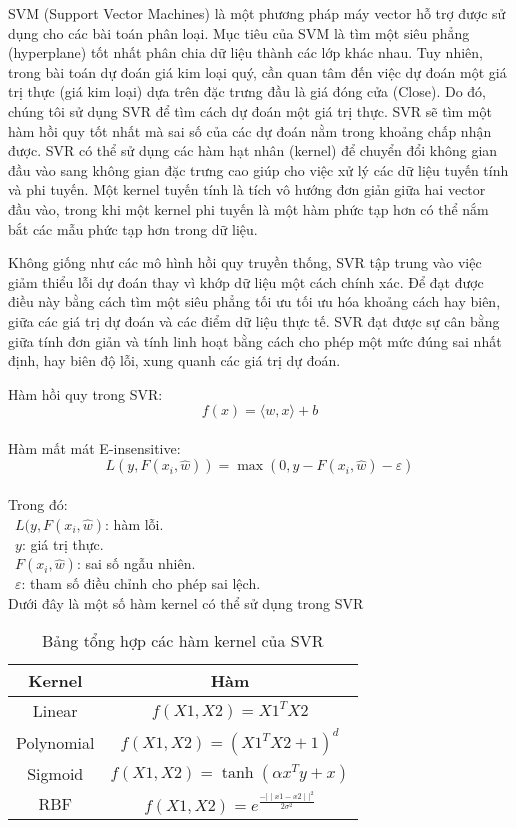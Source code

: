 SVM (Support Vector Machines) là một phương pháp máy vector hỗ trợ được sử dụng cho các bài toán phân loại. Mục tiêu của SVM là tìm một siêu phẳng (hyperplane) tốt nhất phân chia dữ liệu thành các lớp khác nhau. Tuy nhiên, trong bài toán dự đoán giá kim loại quý, cần quan tâm đến việc dự đoán một giá trị thực (giá kim loại) dựa trên đặc trưng đầu là giá đóng cửa (Close). Do đó, chúng tôi sử dụng SVR để tìm cách dự đoán một giá trị thực. SVR sẽ tìm một hàm hồi quy tốt nhất mà sai số của các dự đoán nằm trong khoảng chấp nhận được. SVR có thể sử dụng các hàm hạt nhân (kernel) để chuyển đổi không gian đầu vào sang không gian đặc trưng cao giúp cho việc xử lý các dữ liệu tuyến tính và phi tuyến. Một kernel tuyến tính là tích vô hướng đơn giản giữa hai vector đầu vào, trong khi một kernel phi tuyến là một hàm phức tạp hơn có thể nắm bắt các mẫu phức tạp hơn trong dữ liệu. 

Không giống như các mô hình hồi quy truyền thống, SVR tập trung vào việc giảm thiểu lỗi dự đoán thay vì khớp dữ liệu một cách chính xác. Để đạt được điều này bằng cách tìm một siêu phẳng tối ưu tối ưu hóa khoảng cách hay biên, giữa các giá trị dự đoán và các điểm dữ liệu thực tế. SVR đạt được sự cân bằng giữa tính đơn giản và tính linh hoạt bằng cách cho phép một mức đúng sai nhất định, hay biên độ lỗi, xung quanh các giá trị dự đoán.


Hàm hồi quy trong SVR:
\[
f(x) = \langle w, x \rangle + b
\]\\
Hàm mất mát E-insensitive:
\[
L(y, F(x_i, \hat{w})) = \max(0, y - F(x_i, \hat{w}) - \varepsilon)
\]\\
Trong đó:\\
    \indent\textbullet\ \(L(y,F(x_i,\hat{w})\): hàm lỗi.\\
    \indent\textbullet\ \(y\): giá trị thực.\\
    \indent\textbullet\ \(F(x_i,\hat{w})\): sai số ngẫu nhiên.\\
    \indent\textbullet\ \(\varepsilon\): tham số điều chỉnh cho phép sai lệch.\\
Dưới đây là một số hàm kernel có thể sử dụng trong SVR
\begin{table}[htbp]
  \centering
\begin{tabular}{|c|c|}
    \hline
     Kernel& Hàm\\ \hline
     Linear &  $f(X1,X2)=X1^TX2$\\ \hline
     Polynomial & $f(X1,X2)=(X1^TX2 +1)^d$ \\ \hline
     Sigmoid &  $f(X1,X2)=\tanh(\alpha x^{T}y+x)$\\ \hline
     RBF &  $f(X1,X2)=e^{\frac{-{\mid\mid x1-x2 \mid\mid}^2}{2\sigma^2}}$\\ \hline
\end{tabular}
\caption{Bảng tổng hợp các hàm kernel của SVR}
\end{table}

